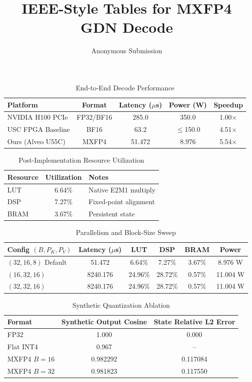 \documentclass[conference]{IEEEtran}
\title{IEEE-Style Tables for MXFP4 GDN Decode}
\author{Anonymous Submission}
\begin{document}
\maketitle

\begin{table}[t]
\centering
\caption{End-to-End Decode Performance}
\label{tab:end_to_end_decode}
\begin{tabular}{@{}lcccc@{}}
\toprule
Platform & Format & Latency ($\mu$s) & Power (W) & Speedup \\
\midrule
NVIDIA H100 PCIe & FP32/BF16 & 285.0 & 350.0 & 1.00$\times$ \\
USC FPGA Baseline & BF16 & 63.2 & $\le$150.0 & 4.51$\times$ \\
Ours (Alveo U55C) & MXFP4 & 51.472 & 8.976 & 5.54$\times$ \\
\bottomrule
\end{tabular}
\end{table}

\begin{table}[t]
\centering
\caption{Post-Implementation Resource Utilization}
\label{tab:resource_utilization}
\begin{tabular}{@{}lcl@{}}
\toprule
Resource & Utilization & Notes \\
\midrule
LUT  & 6.64\% & Native E2M1 multiply \\
DSP  & 7.27\% & Fixed-point alignment \\
BRAM & 3.67\% & Persistent state \\
\bottomrule
\end{tabular}
\end{table}

\begin{table}[t]
\centering
\caption{Parallelism and Block-Size Sweep}
\label{tab:parallelism_sweep}
\begin{tabular}{@{}lccccc@{}}
\toprule
Config $(B, P_K, P_V)$ & Latency ($\mu$s) & LUT & DSP & BRAM & Power \\
\midrule
$(32,16,8)$ Default & 51.472 & 6.64\% & 7.27\% & 3.67\% & 8.976 W \\
$(16,32,16)$ & 8240.176 & 24.96\% & 28.72\% & 0.57\% & 11.004 W \\
$(32,32,16)$ & 8240.176 & 24.96\% & 28.72\% & 0.57\% & 11.004 W \\
\bottomrule
\end{tabular}
\end{table}

\begin{table}[t]
\centering
\caption{Synthetic Quantization Ablation}
\label{tab:quantization_ablation}
\begin{tabular}{@{}lcc@{}}
\toprule
Format & Synthetic Output Cosine & State Relative L2 Error \\
\midrule
FP32 & 1.000 & 0.000 \\
Flat INT4 & 0.967 & -- \\
MXFP4 $B=16$ & 0.982292 & 0.117084 \\
MXFP4 $B=32$ & 0.981823 & 0.117550 \\
\bottomrule
\end{tabular}
\end{table}
\end{document}

